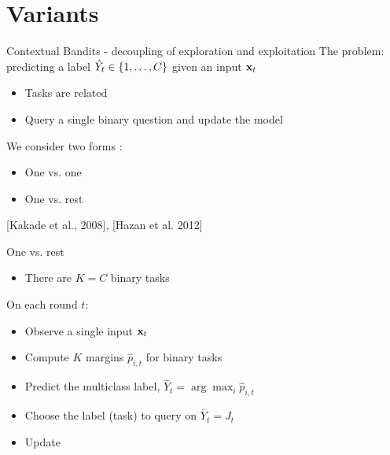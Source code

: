 \documentclass{beamer}
\begin{document}
\section{Variants}

\begin{frame}{Contextual Bandits - decoupling of exploration and exploitation}
The problem: predicting a label $\hat{Y}_t \in\{ 1 , \ldots , C\}$ given an input $\mathbf{x}_{t}$\newline
\begin{itemize}
\item Tasks are related\newline
\item Query a single binary question and update the model\newline
\end{itemize}
We consider  two forms  :\newline
\begin{itemize}
\item One vs. one \newline
\item One vs. rest \newline
\end{itemize}
[Kakade et al., 2008], [Hazan et al. 2012]
\end{frame}


\begin{frame}{One vs. rest}

\begin{itemize}
\item There are $K= C$ binary tasks\newline
\end{itemize}
On each round $t$:\newline
\begin{itemize}
\item Observe a single input $\mathbf{x}_{t}$ \newline
\item Compute $K$  margins $\hat{p}_{i,t}$ for binary tasks \newline
\item Predict the multiclass label, $\hat{Y}_t = \arg\max_i \hat{p}_{i,t}$\newline
\item Choose the label (task) to query on $\bar{Y}_t=J_t$ \newline
\item Update %
\end{itemize}
\end{frame}
\end{document}
